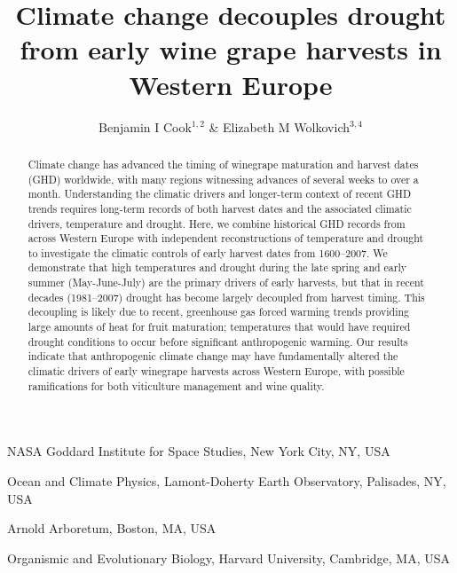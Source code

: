\documentclass[final]{nature}
\title{Climate change decouples drought from early wine grape harvests in Western Europe}
\author{Benjamin I Cook$^{1,2}$ \& Elizabeth M Wolkovich$^{3,4}$}
\begin{document}
\maketitle

\begin{affiliations}
 \item NASA Goddard Institute for Space Studies, New York City, NY, USA
 \item Ocean and Climate Physics, Lamont-Doherty Earth Observatory, Palisades, NY, USA
 \item Arnold Arboretum, Boston, MA, USA
 \item Organismic and Evolutionary Biology, Harvard University, Cambridge, MA, USA
\end{affiliations}

\begin{abstract}
Climate change has advanced the timing of winegrape maturation and harvest dates (GHD) worldwide, with many regions witnessing advances of several weeks to over a month\cite{Duchene:2005bd,Seguin2005,webb2011}. Understanding the climatic drivers and longer-term context of recent GHD trends requires long-term records of both harvest dates and the associated climatic drivers, temperature and drought. Here, we combine historical GHD records from across Western Europe\cite{Daux2012} with independent reconstructions of temperature\cite{Luterbacher2004} and drought\cite{CookOWDA2015,Pauling2006} to investigate the climatic controls of early harvest dates from 1600--2007. We demonstrate that high temperatures and drought during the late spring and early summer (May-June-July) are the primary drivers of early harvests, but that in recent decades (1981--2007) drought has become largely decoupled from harvest timing. This decoupling is likely due to recent, greenhouse gas forced warming trends providing large amounts of heat for fruit maturation; temperatures that would have required drought conditions to occur before significant anthropogenic warming. Our results indicate that anthropogenic climate change may have fundamentally altered the climatic drivers of early winegrape harvests across Western Europe, with possible ramifications for both viticulture management and wine quality.
\end{abstract}
\end{document}
